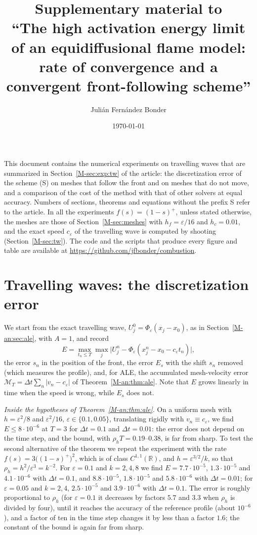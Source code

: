 \documentclass[11pt]{amsart}
\title[Supplementary material]{Supplementary material to\\ ``The high activation energy limit of an equidiffusional flame model: rate of convergence and a convergent front-following scheme''}
\author{Juli\'an Fern\'andez Bonder}
\date{\today}
\theoremstyle{definition}
\theoremstyle{remark}
\newcommand{\ve}{\varepsilon}
\newcommand{\R}{\mathbb{R}}
\begin{document}
\maketitle

This document contains the numerical experiments on travelling waves that are summarized
in Section~\ref{M-sec:exp:tw} of the article: the discretization error of the scheme (S) on
meshes that follow the front and on meshes that do not move, and a comparison of the
cost of the method with that of other solvers at equal accuracy. Numbers of sections,
theorems and equations without the prefix S refer to the article. In all the experiments
$f(s)=(1-s)^+$, unless stated otherwise, the meshes are those of
Section~\ref{M-sec:meshes} with $h_f=\ve/16$ and $h_c=0.01$, and the exact speed $c_\ve$ of the
travelling wave is computed by shooting (Section~\ref{M-sec:tw}). The code and the scripts
that produce every figure and table are available at
\url{https://github.com/jfbonder/combustion}.

\section{Travelling waves: the discretization error}\label{S:tw}

We start from the exact travelling wave, $U^0_j=\Phi_\ve(x_j-x_0)$, as in
Section~\ref{M-an:sec:ale}, with $A=1$, and record
\[
E=\max_{t_n\le T}\max_j\big|U^n_j-\Phi_\ve(x^n_j-x_0-c_\ve t_n)\big| ,
\]
the error $s_n$ in the position of the front, the error $E_s$ with the shift $s_n$
removed (which measures the profile), and, for ALE, the accumulated mesh-velocity
error $\mathcal M_T=\Delta t\sum_n|v_n-c_\ve|$ of Theorem~\ref{M-an:thm:ale}. Note that $E$ grows
linearly in time when the speed is wrong, while $E_s$ does not.

\emph{Inside the hypotheses of Theorem~\ref{M-an:thm:ale}.} On a uniform mesh with
$h=\ve^2/8$ and $\ve^2/16$, $\ve\in\{0.1,0.05\}$, translating rigidly with $v_n\equiv c_\ve$, we find
$E\le8\cdot10^{-6}$ at $T=3$ for $\Delta t=0.1$ and $\Delta t=0.01$: the error does not depend on the
time step, and the bound, with $\rho_hT=0.19$--$0.38$, is far from sharp. To test the
second alternative of the theorem we repeat the experiment with the rate
$f(s)=3\big((1-s)^+\big)^2$, which is of class $C^{1,1}(\R)$, and $h=\ve^{3/2}/k$, so that
$\rho_h=h^2/\ve^3=k^{-2}$. For $\ve=0.1$ and $k=2,4,8$ we find $E=7.7\cdot10^{-5}$,
$1.3\cdot10^{-5}$ and $4.1\cdot10^{-6}$ with $\Delta t=0.1$, and $8.8\cdot10^{-5}$, $1.8\cdot10^{-5}$ and
$5.8\cdot10^{-6}$ with $\Delta t=0.01$; for $\ve=0.05$ and $k=2,4$, $2.5\cdot10^{-5}$ and $3.9\cdot10^{-6}$
with $\Delta t=0.1$. The error is roughly proportional to $\rho_h$ (for $\ve=0.1$ it decreases by factors $5.7$
and $3.3$ when $\rho_h$ is divided by four), until it reaches the
accuracy of the reference profile (about $10^{-6}$), and a factor of ten in the time step
changes it by less than a factor $1.6$; the constant of the bound is again far from
sharp.
\end{document}
